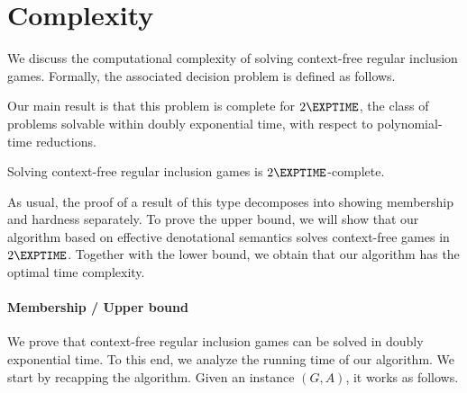 \documentclass[../../diss.tex]{subfiles}
\begin{document}
\section{Complexity}%
\label{Section:CFGamesComplexity}%

We discuss the computational complexity of solving context-free regular inclusion games.
Formally, the associated decision problem is defined as follows.

\begin{problem}
\end{problem}

Our main result is that this problem is complete for $2\EXPTIME$, the class of problems solvable within doubly exponential time, with respect to polynomial-time reductions.

\begin{theorem}%
\label{Theorem:CFGamesComplexity}%
    Solving context-free regular inclusion games is $2\EXPTIME$-complete.
\end{theorem}

As usual, the proof of a result of this type decomposes into showing membership and hardness separately.
To prove the upper bound, we will show that our algorithm based on effective denotational semantics solves context-free games in $2\EXPTIME$.
Together with the lower bound, we obtain that our algorithm has the optimal time complexity.

\paragraph{Membership / Upper bound}

We prove that context-free regular inclusion games can be solved in doubly exponential time.
To this end, we analyze the running time of our algorithm.
We start by recapping the algorithm.
Given an instance $(G,A)$, it works as follows.
\end{document}
